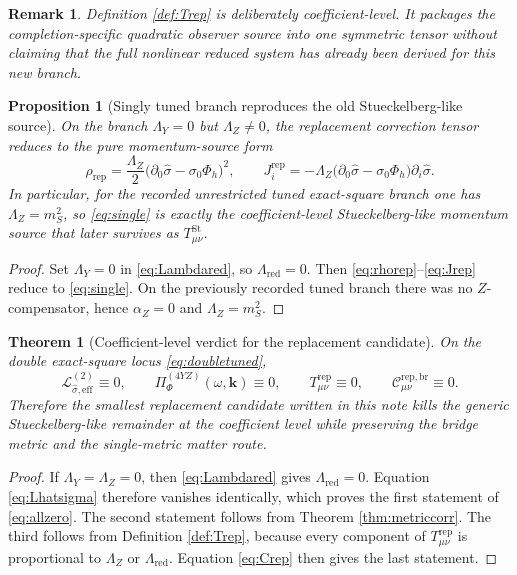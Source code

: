 \documentclass[11pt]{article}
\newtheorem{proposition}{Proposition}
\newtheorem{remark}{Remark}
\newtheorem{theorem}{Theorem}
\begin{document}
\begin{remark}
Definition \ref{def:Trep} is deliberately coefficient-level. It packages the completion-specific quadratic observer source into one symmetric tensor without claiming that the full nonlinear reduced system has already been derived for this new branch.
\end{remark}

\begin{proposition}[Singly tuned branch reproduces the old Stueckelberg-like source]
\label{prop:single}
On the branch \(\Lambda_Y=0\) but \(\Lambda_Z\neq 0\), the replacement correction tensor reduces to the pure momentum-source form
\begin{equation}
\rho_{\mathrm{rep}}
=
\frac{\Lambda_Z}{2}\bigl(\partial_0\hat\sigma-\sigma_0\Phi_h\bigr)^2,
\qquad
J_i^{\mathrm{rep}}
=
-\Lambda_Z\bigl(\partial_0\hat\sigma-\sigma_0\Phi_h\bigr)\partial_i\hat\sigma.
\label{eq:single}
\end{equation}
In particular, for the recorded unrestricted tuned exact-square branch one has \(\Lambda_Z=m_S^2\), so \eqref{eq:single} is exactly the coefficient-level Stueckelberg-like momentum source that later survives as \(T_{\mu\nu}^{\mathrm{St}}\).
\end{proposition}

\begin{proof}
Set \(\Lambda_Y=0\) in \eqref{eq:Lambdared}, so \(\Lambda_{\mathrm{red}}=0\). Then \eqref{eq:rhorep}--\eqref{eq:Jrep} reduce to \eqref{eq:single}. On the previously recorded tuned branch there was no \(Z\)-compensator, hence \(\alpha_Z=0\) and \(\Lambda_Z=m_S^2\).
\end{proof}

\begin{theorem}[Coefficient-level verdict for the replacement candidate]
\label{thm:verdict}
On the double exact-square locus \eqref{eq:doubletuned},
\begin{equation}
\mathcal L_{\hat\sigma,\mathrm{eff}}^{(2)}\equiv 0,
\qquad
\Pi_{\Phi}^{(4YZ)}(\omega,\mathbf{k})\equiv 0,
\qquad
T_{\mu\nu}^{\mathrm{rep}}\equiv 0,
\qquad
\mathcal C_{\mu\nu}^{\mathrm{rep,br}}\equiv 0.
\label{eq:allzero}
\end{equation}
Therefore the smallest replacement candidate written in this note kills the generic Stueckelberg-like remainder at the coefficient level while preserving the bridge metric and the single-metric matter route.
\end{theorem}

\begin{proof}
If \(\Lambda_Y=\Lambda_Z=0\), then \eqref{eq:Lambdared} gives \(\Lambda_{\mathrm{red}}=0\). Equation \eqref{eq:Lhatsigma} therefore vanishes identically, which proves the first statement of \eqref{eq:allzero}. The second statement follows from Theorem \ref{thm:metriccorr}. The third follows from Definition \ref{def:Trep}, because every component of \(T_{\mu\nu}^{\mathrm{rep}}\) is proportional to \(\Lambda_Z\) or \(\Lambda_{\mathrm{red}}\). Equation \eqref{eq:Crep} then gives the last statement.
\end{proof}
\end{document}
